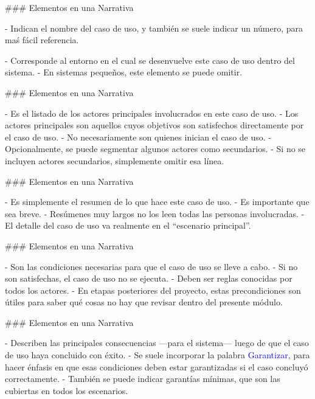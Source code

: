 ### Elementos en una Narrativa


- Indican el nombre del caso de uso, y también se suele indicar un número, para maś fácil referencia.


- Corresponde al entorno en el cual se desenvuelve este caso de uso dentro del sistema.
- En sistemas pequeños, este elemento se puede omitir.

### Elementos en una Narrativa


- Es el listado de los actores principales involucrados en este caso de uso.
    - Los actores principales son aquellos cuyos objetivos son satisfechos directamente
    por el caso de uso.
    - No necesariamente son quienes inician el caso de uso.
- Opcionalmente, se puede segmentar algunos actores como secundarios.
    - Si no se incluyen actores secundarios, simplemente omitir esa línea.


### Elementos en una Narrativa


- Es simplemente el resumen de lo que hace este caso de uso.
- Es importante que sea breve.
    - Resúmenes muy largos no los leen todas las personas involucradas.
    - El detalle del caso de uso va realmente en el ``escenario principal''.

### Elementos en una Narrativa


- Son las condiciones necesarias para que el caso de uso se lleve a cabo.
    - Si no son satisfechas, el caso de uso no se ejecuta.
- Deben ser reglas conocidas por todos los actores.
- En etapas posteriores del proyecto, estas precondiciones son útiles para
saber qué cosas no hay que revisar dentro del presente módulo.

### Elementos en una Narrativa


- Describen las principales consecuencias ---para el sistema--- luego de que el caso de uso haya
concluido con éxito.
- Se suele incorporar la palabra \textcolor{blue}{Garantizar}, para hacer énfasis en que
esas condiciones deben estar garantizadas si el caso concluyó correctamente.
    - También se puede indicar garantías mínimas, que son las cubiertas en todos los escenarios.


